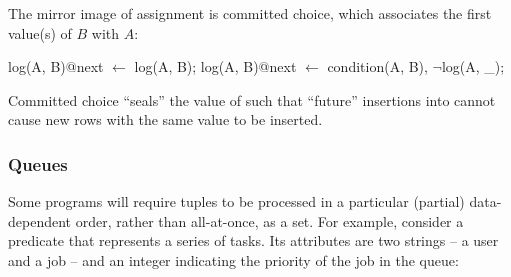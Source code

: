 The mirror image of assignment is committed choice, which associates the first
value(s) of $B$ with $A$:

\begin{Dedalus}
log(A, B)@next \(\leftarrow\) log(A, B);
log(A, B)@next \(\leftarrow\) condition(A, B), \(\lnot\)log(A, _);
\end{Dedalus}

Committed choice ``seals'' the value of  such that ``future''
insertions into  cannot cause new rows with the same
 value to be inserted.


\subsubsection{Queues}



Some programs will require tuples to be processed in a particular (partial)
data-dependent order, rather than all-at-once, as a set.  For example,
consider a predicate  that represents a series of
tasks.
Its attributes are two strings -- a user and a job -- and an integer indicating
the priority of the job in the queue:

